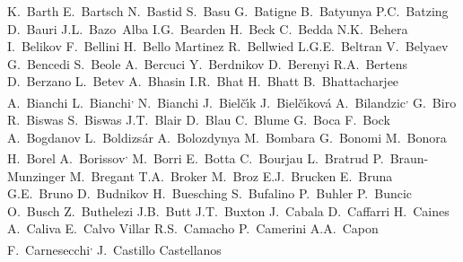 \begin{flushleft}
K.~Barth\And 
E.~Bartsch\And 
N.~Bastid\And 
S.~Basu\And 
G.~Batigne\And 
B.~Batyunya\And 
P.C.~Batzing\And 
D.~Bauri\And 
J.L.~Bazo~Alba\And 
I.G.~Bearden\And 
H.~Beck\And 
C.~Bedda\And 
N.K.~Behera\And 
I.~Belikov\And 
F.~Bellini\And 
H.~Bello Martinez\And 
R.~Bellwied\And 
L.G.E.~Beltran\And 
V.~Belyaev\And 
G.~Bencedi\And 
S.~Beole\And 
A.~Bercuci\And 
Y.~Berdnikov\And 
D.~Berenyi\And 
R.A.~Bertens\And 
D.~Berzano\And 
L.~Betev\And 
A.~Bhasin\And 
I.R.~Bhat\And 
H.~Bhatt\And 
B.~Bhattacharjee\And 
A.~Bianchi\And 
L.~Bianchi\textsuperscript{,}\And 
N.~Bianchi\And 
J.~Biel\v{c}\'{\i}k\And 
J.~Biel\v{c}\'{\i}kov\'{a}\And 
A.~Bilandzic\textsuperscript{,}\And 
G.~Biro\And 
R.~Biswas\And 
S.~Biswas\And 
J.T.~Blair\And 
D.~Blau\And 
C.~Blume\And 
G.~Boca\And 
F.~Bock\And 
A.~Bogdanov\And 
L.~Boldizs\'{a}r\And 
A.~Bolozdynya\And 
M.~Bombara\And 
G.~Bonomi\And 
M.~Bonora\And 
H.~Borel\And 
A.~Borissov\textsuperscript{,}\And 
M.~Borri\And 
E.~Botta\And 
C.~Bourjau\And 
L.~Bratrud\And 
P.~Braun-Munzinger\And 
M.~Bregant\And 
T.A.~Broker\And 
M.~Broz\And 
E.J.~Brucken\And 
E.~Bruna\And 
G.E.~Bruno\And 
D.~Budnikov\And 
H.~Buesching\And 
S.~Bufalino\And 
P.~Buhler\And 
P.~Buncic\And 
O.~Busch\And 
Z.~Buthelezi\And 
J.B.~Butt\And 
J.T.~Buxton\And 
J.~Cabala\And 
D.~Caffarri\And 
H.~Caines\And 
A.~Caliva\And 
E.~Calvo Villar\And 
R.S.~Camacho\And 
P.~Camerini\And 
A.A.~Capon\And 
F.~Carnesecchi\textsuperscript{,}\And 
J.~Castillo Castellanos\And 

\end{flushleft}
